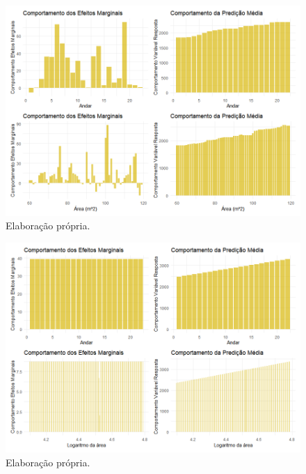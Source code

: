 \begin{figure}[H]
    \centering
    \includegraphics[scale = .70]{imagens/efeitos_marginais_rf.png}
    \caption{ Elaboração própria.}
\end{figure}



\begin{figure}[H]
    \centering
    \includegraphics[scale = .70]{imagens/efeitos_marginais_lm.png}
    \caption{ Elaboração própria.}
\end{figure}